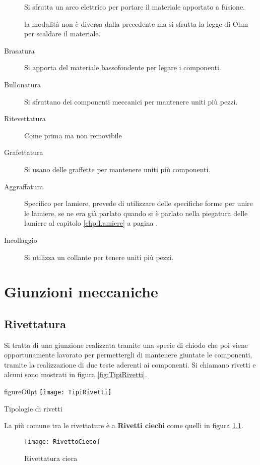 \begin{description}
\item[] Si sfrutta un arco elettrico per portare il materiale apportato a fusione.
\item[] la modalità non è diversa dalla precedente ma si sfrutta la legge di Ohm per scaldare il materiale.
\item[Brasatura] Si apporta del materiale bassofondente per legare i componenti.
\item[Bullonatura] Si sfruttano dei componenti meccanici per mantenere uniti più pezzi.
\item[Ritevettatura] Come prima ma non removibile
\item[Grafettatura] Si usano delle graffette per mantenere uniti più componenti.
\item[Aggraffatura] Specifico per lamiere, prevede di utilizzare delle specifiche forme per unire le lamiere, se ne era già parlato quando si è parlato nella piegatura delle lamiere al capitolo \ref{chp:Lamiere} a pagina \pageref{chp:Lamiere}.
\item[Incollaggio] Si utilizza un collante per tenere uniti più pezzi.
\end{description}

\chapter{Giunzioni meccaniche}\label{chp:GiuntoMecc}
\section{Rivettatura}
Si tratta di una giunzione realizzata tramite una specie di chiodo che poi viene opportunamente lavorato per permettergli di mantenere giuntate le componenti, tramite la realizzazione di due teste aderenti ai componenti.
Si chiamano rivetti e alcuni sono mostrati in figura \ref{fig:TipiRivetti}.

\begin{wrapfloat}{figure}{O}{0pt}
\texttt{[image: TipiRivetti]}
\caption{Tipologie di rivetti}
\label{fig:TipiRivetti}
\end{wrapfloat}

La più comune tra le rivettature è a \textbf{Rivetti ciechi} come quelli in figura \ref{fig:RivettoCieco}.

\begin{figure}
\centering
\texttt{[image: RivettoCieco]}
\caption{Rivettatura cieca}
\label{fig:RivettoCieco}
\end{figure}

